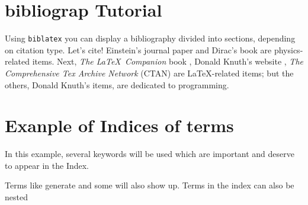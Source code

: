\documentclass[a4paper, 12pt, oneside, times, print, NoDraft]{template/UBtemplate}
\begin{document}
\chapter{bibliograp Tutorial}

Using \texttt{biblatex} you can display a bibliography divided into sections, depending on citation type. 
Let's cite! Einstein's journal paper \cite{einstein} and Dirac's book \cite{dirac} are physics-related items. 
Next, \textit{The \LaTeX\ Companion} book \cite{latexcompanion}, Donald Knuth's website \cite{knuthwebsite}, \textit{The Comprehensive Tex Archive Network} (CTAN) \cite{ctan} are \LaTeX-related items; but the others, Donald Knuth's items, \cite{knuth-fa,knuth-acp} are dedicated to programming.



\chapter{Exanple of Indices of terms}

In this example, several keywords will be 
used which are important and deserve to appear in the 
Index.

Terms like generate and some 
will also show up. Terms in the index can also be 
nested 













\end{document}
